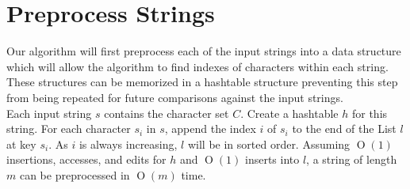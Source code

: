 \documentclass[10pt]{article}
\newcommand{\bigO}[1]{\ensuremath{\operatorname{O}\left(#1\right)}}
\begin{document}
  \section{Preprocess Strings}
  Our algorithm will first preprocess each of the input strings into a data structure which will allow the algorithm to find indexes of characters within each string.  These structures can be memorized in a hashtable structure preventing this step from being repeated for future comparisons against the input strings.\\[2ex]
  Each input string $s$ contains the character set $C$.  Create a hashtable $h$ for this string.  For each character $s_i$ in $s$, append the index $i$ of $s_i$ to the end of the List $l$ at key $s_i$.  As $i$ is always increasing, $l$ will be in sorted order.  Assuming \bigO{1} insertions, accesses, and edits for $h$ and \bigO{1} inserts into $l$, a string of length $m$ can be preprocessed in \bigO{m} time.
  
\end{document}

